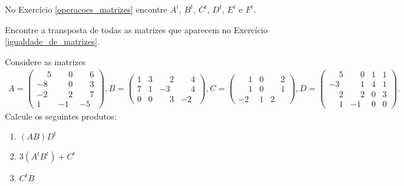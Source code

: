 \documentclass[12pt]{exam}
\begin{document}
    \vspace{.3cm}

    \questao{} No Exercício \ref{operacoes_matrizes} encontre $A^t$, $B^t$, $C^t$, $D^t$, $E^t$ e $F^t$.

    \vspace{.3cm}

    \questao{} Encontre a transposta de todas as matrizes que aparecem no Exercício \ref{igualdade_de_matrizes}.

    \vspace{.3cm}

    \questao{} Considere as matrizes
    \begin{align*}
        A = \begin{pmatrix}\phantom{-} 5 & \phantom{-} 0 & \phantom{-} 6\\-8 & \phantom{-} 0 & \phantom{-} 3\\-2 & \phantom{-} 2 & \phantom{-} 7\\1 & -1 & -5\end{pmatrix},
        B = \begin{pmatrix}1 & 3 & \phantom{-} 2 & \phantom{-} 4\\7 & 1 & -3 & \phantom{-} 4\\0 & 0 & \phantom{-} 3 & -2\end{pmatrix},
        C = \begin{pmatrix}\phantom{-} 1 & 0 & \phantom{-} 2\\\phantom{-} 1 & 0 & \phantom{-} 1\\-2 & 1 & 2\end{pmatrix},
        D = \begin{pmatrix}\phantom{-} 5 & \phantom{-} 0 & 1 & 1\\-3 & \phantom{-} 1 & 4 & 1\\\phantom{-} 2 & \phantom{-} 2 & 0 & 3\\\phantom{-} 1 & -1 & 0 & 0\end{pmatrix}.
    \end{align*}
    Calcule os seguintes produtos:
    \begin{enumerate}[label={\alph*})]
        \item $(AB)D^t$
        \item $3(A^tB^t) + C^t$
        \item $C^tB$
    \end{enumerate}

    \vspace{.3cm}
    
\end{document}
